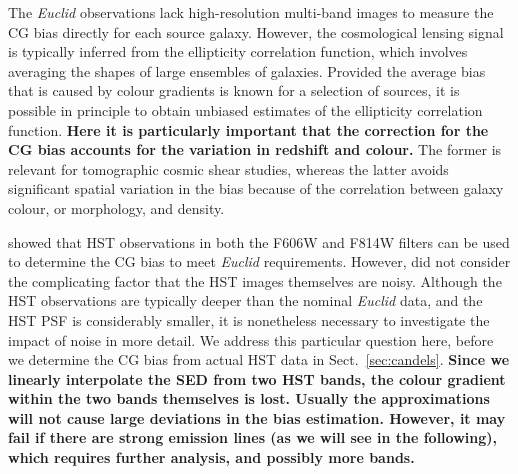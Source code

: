 \documentclass[useAMS,usenatbib]{mnras}
\begin{document}
The {\it Euclid} observations lack high-resolution multi-band images to measure the CG bias directly for each source galaxy. However, the cosmological lensing signal is typically inferred from the ellipticity correlation function, which involves  averaging the shapes of large ensembles of galaxies.
Provided the average bias that is caused by colour gradients is known for a selection of sources, it is possible in principle to obtain unbiased estimates of the ellipticity correlation function.
{\bf Here it is particularly important that the correction for the CG bias accounts for the variation in redshift and colour.}
The former is relevant for tomographic cosmic shear studies, whereas the latter avoids significant spatial variation in the bias because of the correlation between galaxy colour, or morphology, and density.

 showed that HST observations in both the F606W and F814W filters can be used to determine the CG bias to meet {\it Euclid} requirements. However,  did not consider the complicating factor that the HST images themselves are noisy. Although the HST observations are typically deeper than the nominal {\it Euclid} data, and the HST PSF is considerably smaller, it is nonetheless necessary to investigate the impact of noise in more detail. We address this particular question here, before we determine the CG bias from actual HST data in Sect.~\ref{sec:candels}.
           {\bf Since we linearly interpolate the SED from two HST bands, the colour gradient within the two bands themselves is lost. Usually the approximations will not cause large deviations in the bias estimation. However, it may fail if there are strong emission lines (as we will see in the following), which requires further analysis, and possibly more bands.}
\end{document}
